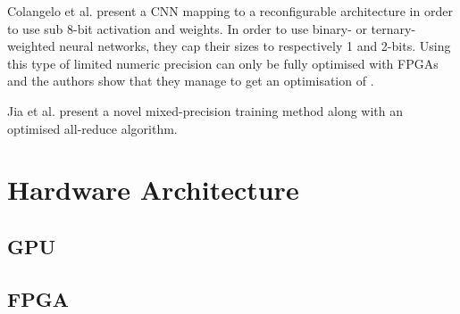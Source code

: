Colangelo et al. \cite{Colangelo2018} present a CNN mapping to a reconfigurable architecture in order to use sub 8-bit activation and weights. In order to use binary- or ternary-weighted neural networks, they cap their sizes to respectively 1 and 2-bits. Using this type of limited numeric precision can only be fully optimised with FPGAs and the authors show that they manage to get an optimisation of .

Jia et al. \cite{Jia2018} present a novel mixed-precision training method along with an optimised all-reduce algorithm.


\section{Hardware Architecture}


\subsection{GPU}


\subsection{FPGA}
